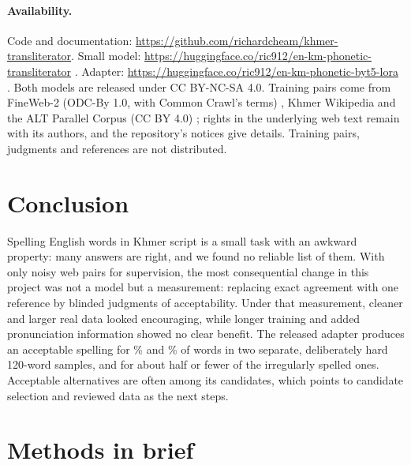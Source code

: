 \documentclass[10pt,a4paper,twocolumn]{article}
\begin{document}
\paragraph{Availability.}
{\raggedright
Code and documentation:
\url{https://github.com/richardcheam/khmer-transliterator}.
Small model: \url{https://huggingface.co/ric912/en-km-phonetic-transliterator}
\citep{release-small}. Adapter: \url{https://huggingface.co/ric912/en-km-phonetic-byt5-lora}
\citep{release-byt5}. Both models are released under CC BY-NC-SA 4.0. Training pairs come from FineWeb-2 (ODC-By
1.0, with Common Crawl's terms) \citep{fineweb2-card}, Khmer Wikipedia \citep{wikimedia-tou} and the ALT Parallel
Corpus (CC BY 4.0) \citep{nict-alt}; rights in the underlying web text remain with its authors, and the
repository's notices give details. Training pairs, judgments and references are not distributed.\par}

\section{Conclusion}
\label{sec:conclusion}

Spelling English words in Khmer script is a small task with an awkward property: many answers are right, and we
found no reliable list of them. With only noisy web pairs for supervision, the most consequential change in this
project was not a model but a measurement: replacing exact agreement with one reference by blinded judgments of
acceptability. Under that measurement, cleaner and larger real data looked encouraging, while longer training and
added pronunciation information showed no clear benefit. The released adapter produces an acceptable spelling for
\% and \% of words in two separate, deliberately hard 120-word samples,
and for about half or fewer of the irregularly spelled ones. Acceptable alternatives are often among its candidates, which points to candidate
selection and reviewed data as the next steps.




\clearpage
\onecolumn
\appendix
\section{Methods in brief}
\label{app:methods}
\end{document}
